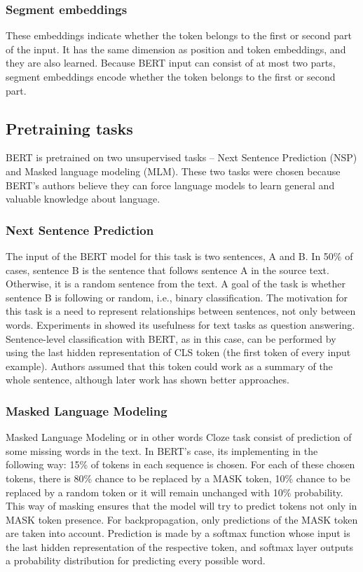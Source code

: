 \subsubsection*{Segment embeddings}
These embeddings indicate whether the token belongs to the first or second part of the input. It has the same dimension as position and token embeddings, and they are also learned. Because BERT input can consist of at most two parts, segment embeddings encode whether the token belongs to the first or second part.

\subsection{Pretraining tasks}

BERT is pretrained on two unsupervised tasks -- Next Sentence Prediction (NSP) and Masked language modeling (MLM). These two tasks were chosen because BERT's authors believe they can force language models to learn general and valuable knowledge about language.

\subsubsection{Next Sentence Prediction}
The input of the BERT model for this task is two sentences, A and B. In 50\% of cases, sentence B is the sentence that follows sentence A in the source text. Otherwise, it is a random sentence from the text. A goal of the task is whether sentence B is following or random, i.e., binary classification. The motivation for this task is a need to represent relationships between sentences, not only between words. Experiments in \citep{
Devlin2019} showed its usefulness for text tasks as question answering. Sentence-level classification with BERT, as in this case, can be performed by using the last hidden representation of CLS token (the first token of every input example). Authors assumed that this token could work as a summary of the whole sentence, although later work has shown better approaches. %

\subsubsection{Masked Language Modeling}
Masked Language Modeling or in other words Cloze task \citep{Taylor1953}
consist of prediction of some missing words in the text. In BERT's case, its implementing in the following way: 15\% of tokens in each sequence is chosen. For each of these chosen tokens, there is 80\% chance to be replaced by a MASK token, 10\% chance to be replaced by a random token or it will remain unchanged with 10\% probability. This way of masking ensures that the model will try to predict tokens not only in MASK token presence. For backpropagation, only predictions of the MASK token are taken into account. Prediction is made by a softmax function whose input is the last hidden representation of the respective token, and softmax layer outputs a probability distribution for predicting every possible word. %

